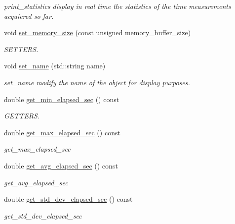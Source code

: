 \begin{DoxyCompactItemize}
\begin{DoxyCompactList}\small\item\em print\+\_\+statistics display in real time the statistics of the time measurements acquiered so far. \end{DoxyCompactList}\item 
void \hyperlink{classreal__time__tools_1_1Timer_a0319fbdc56fd5046d701c8728b27e860}{set\+\_\+memory\+\_\+size} (const unsigned memory\+\_\+buffer\+\_\+size)
\begin{DoxyCompactList}\small\item\em S\+E\+T\+T\+E\+RS. \end{DoxyCompactList}\item 
void \hyperlink{classreal__time__tools_1_1Timer_a1005cc3c2d7e68ab6d97c8d3167c7f93}{set\+\_\+name} (std\+::string name)
\begin{DoxyCompactList}\small\item\em set\+\_\+name modify the name of the object for display purposes. \end{DoxyCompactList}\item 
double \hyperlink{classreal__time__tools_1_1Timer_a7ff2401f6c1e28993575f153430db8ef}{get\+\_\+min\+\_\+elapsed\+\_\+sec} () const 
\begin{DoxyCompactList}\small\item\em G\+E\+T\+T\+E\+RS. \end{DoxyCompactList}\item 
double \hyperlink{classreal__time__tools_1_1Timer_a365c7dfdddf6c3f14b41bd65b01bc79a}{get\+\_\+max\+\_\+elapsed\+\_\+sec} () const 
\begin{DoxyCompactList}\small\item\em get\+\_\+max\+\_\+elapsed\+\_\+sec \end{DoxyCompactList}\item 
double \hyperlink{classreal__time__tools_1_1Timer_a0b5b997f0984a684a16c5e35e5ca07e7}{get\+\_\+avg\+\_\+elapsed\+\_\+sec} () const 
\begin{DoxyCompactList}\small\item\em get\+\_\+avg\+\_\+elapsed\+\_\+sec \end{DoxyCompactList}\item 
double \hyperlink{classreal__time__tools_1_1Timer_a417d3213c6f315b9a27ad424410c7440}{get\+\_\+std\+\_\+dev\+\_\+elapsed\+\_\+sec} () const 
\begin{DoxyCompactList}\small\item\em get\+\_\+std\+\_\+dev\+\_\+elapsed\+\_\+sec \end{DoxyCompactList}\end{DoxyCompactItemize}
